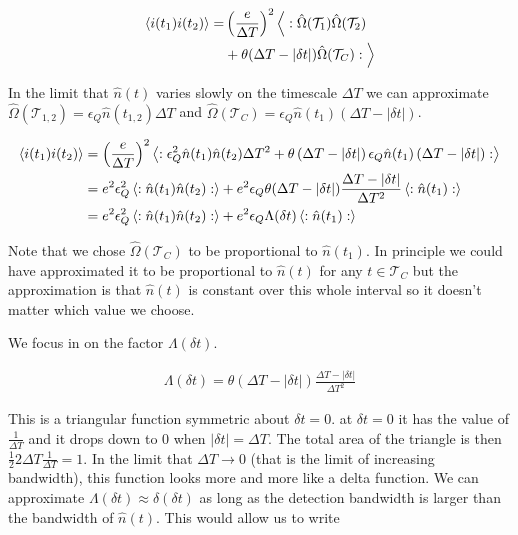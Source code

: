 \documentclass[12pt]{article}
\newcommand{\ep}{\epsilon}
\newcommand{\mc}[1]{\mathcal{#1}}
\begin{document}
\begin{align}
\Braket{i(t_1)i(t_2)} =& \left(\frac{e}{\Delta T}\right)^2 \Big\langle:\hat{\Omega}(\mc{T}_1)\hat{\Omega}(\mc{T}_2)\\
&+ \theta(\Delta T-\lvert\delta t\rvert) \hat{\Omega}(\mc{T}_C) :\Big\rangle
\end{align}

In the limit that $\hat{n}(t)$ varies slowly on the timescale $\Delta T$ we can approximate $\hat{\Omega}(\mc{T}_{1,2}) = \ep_Q \hat{n}(t_{1,2}) \Delta T$ and $\hat{\Omega}(\mc{T}_C) = \ep_Q\hat{n}(t_1)(\Delta T - \lvert \delta t\rvert)$.

\begin{align}
\Braket{i(t_1)i(t_2)} &= \left(\frac{e}{\Delta T}\right)^2 \Braket{:\ep_Q^2\hat{n}(t_1)\hat{n}(t_2) \Delta T^2 + \theta\left(\Delta T- \lvert \delta t\rvert\right)\ep_Q\hat{n}(t_1)\left(\Delta T-\lvert \delta t\rvert \right):}\\
&=e^2 \ep_Q^2 \Braket{:\hat{n}(t_1)\hat{n}(t_2):} + e^2 \ep_Q \theta(\Delta T-|\delta t|) \frac{\Delta T-|\delta t|}{\Delta T^2} \braket{:\hat{n}(t_1):}\\
&=e^2 \ep_Q^2 \Braket{:\hat{n}(t_1)\hat{n}(t_2):} + e^2 \ep_Q \Lambda(\delta t) \braket{:\hat{n}(t_1):}
\end{align}

Note that we chose $\hat{\Omega}(\mc{T}_C)$ to be proportional to $\hat{n}(t_1)$. In principle we could have approximated it to be proportional to $\hat{n}(t)$ for any $t\in \mc{T}_C$ but the approximation is that $\hat{n}(t)$ is constant over this whole interval so it doesn't matter which value we choose.

We focus in on the factor $\Lambda(\delta t)$. 

\begin{align}
\Lambda(\delta t) = \theta(\Delta T - |\delta t|)\frac{\Delta T-|\delta t|}{\Delta T^2}
\end{align}

This is a triangular function symmetric about $\delta t=0$. at $\delta t=0$ it has the value of $\frac{1}{\Delta T}$ and it drops down to 0 when $|\delta t| = \Delta T$. The total area of the triangle is then $\frac{1}{2} 2\Delta T \frac{1}{\Delta T} = 1$. In the limit that $\Delta T \rightarrow 0$ (that is the limit of increasing bandwidth), this function looks more and more like a delta function. We can approximate $\Lambda(\delta t) \approx \delta(\delta t)$ as long as the detection bandwidth is larger than the bandwidth of $\hat{n}(t)$. This would allow us to write
\end{document}

